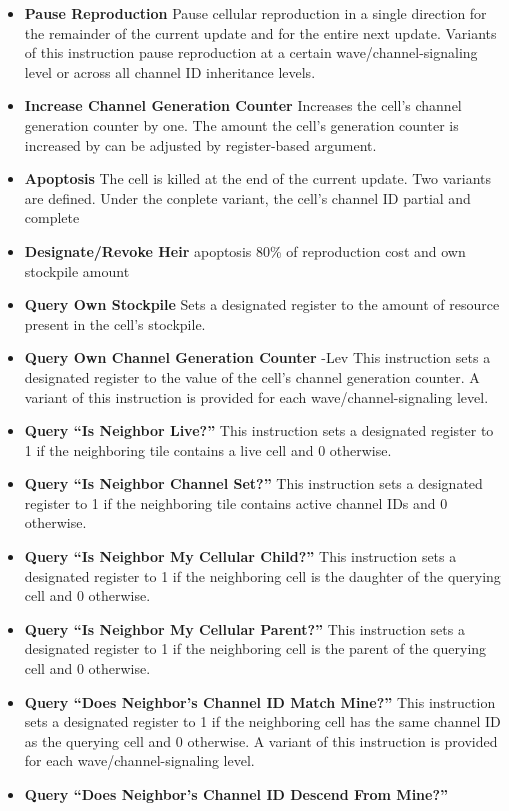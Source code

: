\begin{itemize}
\item \textbf{Pause Reproduction}
Pause cellular reproduction in a single direction for the remainder of the current update and for the entire next update.
Variants of this instruction pause reproduction at a certain wave/channel-signaling level or across all channel ID inheritance levels.
\item \textbf{Increase Channel Generation Counter}
Increases the cell's channel generation counter by one.
The amount the cell's generation counter is increased by can be adjusted by register-based argument.
\item \textbf{Apoptosis}
The cell is killed at the end of the current update.
Two variants are defined.
Under the conplete variant, the cell's channel ID partial and complete
\item \textbf{Designate/Revoke Heir} apoptosis 80\% of reproduction cost and own stockpile amount
\item \textbf{Query Own Stockpile}
Sets a designated register to the amount of resource present in the cell's stockpile.
\item \textbf{Query Own Channel Generation Counter} -Lev
This instruction sets a designated register to the value of the cell's channel generation counter.
A variant of this instruction is provided for each wave/channel-signaling level.
\item \textbf{Query ``Is Neighbor Live?''}
This instruction sets a designated register to 1 if the neighboring tile contains a live cell and 0 otherwise.
\item \textbf{Query ``Is Neighbor Channel Set?''}
This instruction sets a designated register to 1 if the neighboring tile contains active channel IDs and 0 otherwise.
\item \textbf{Query ``Is Neighbor My Cellular Child?''}
This instruction sets a designated register to 1 if the neighboring cell is the daughter of the querying cell and 0 otherwise.
\item \textbf{Query ``Is Neighbor My Cellular Parent?''}
This instruction sets a designated register to 1 if the neighboring cell is the parent of the querying cell and 0 otherwise.
\item \textbf{Query ``Does Neighbor's Channel ID Match Mine?''}
This instruction sets a designated register to 1 if the neighboring cell has the same channel ID as the querying cell and 0 otherwise.
A variant of this instruction is provided for each wave/channel-signaling level.
\item \textbf{Query ``Does Neighbor's Channel ID Descend From Mine?''}

\end{itemize}
